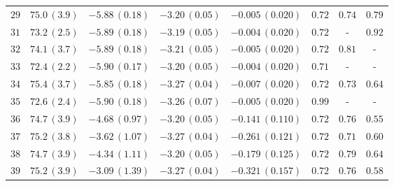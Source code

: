 \begin{center}
\begin{longtable}{@{\extracolsep{\fill}}cccccccc@{}}
$29$ & $75.0\,(3.9)$ & $-5.88\,(0.18)$ & $-3.20\,(0.05)$ & $-0.005\,(0.020) $ & $ 0.72 $ & $ 0.74 $ & $ 0.79$\\
$31$ & $73.2\,(2.5)$ & $-5.89\,(0.18)$ & $-3.19\,(0.05)$ & $-0.004\,(0.020) $ & $ 0.72$ & - & $ 0.92$\\
$32$ & $74.1\,(3.7)$ & $-5.89\,(0.18)$ & $-3.21\,(0.05)$ & $-0.005\,(0.020) $ & $ 0.72 $ & $ 0.81$ & -\\
$33$ & $72.4\,(2.2)$ & $-5.90\,(0.17)$ & $-3.20\,(0.05)$ & $-0.004\,(0.020) $ & $ 0.71$ & - & -\\
$34$ & $75.4\,(3.7)$ & $-5.85\,(0.18)$ & $-3.27\,(0.04)$ & $-0.007\,(0.020) $ & $ 0.72 $ & $ 0.73$ & $0.64 $\\
$35$ & $72.6\,(2.4)$ & $-5.90\,(0.18)$ & $-3.26\,(0.07)$ & $-0.005\,(0.020) $ & $ 0.99$ & - & - \\
$36$ & $74.7\,(3.9)$ & $-4.68\,(0.97)$ & $-3.20\,(0.05) $ & $-0.141\,(0.110) $ & $0.72 $ & $ 0.76$ & $0.55 $ \\
$37$ & $ 75.2\,(3.8)$ & $-3.62\,(1.07)$ & $-3.27\,(0.04)$ & $-0.261\,(0.121) $ & $0.72 $ & $ 0.71$ & $0.60 $\\
$38$ & $74.7\,(3.9)$ & $-4.34\,(1.11)$ & $-3.20\,(0.05)$ & $-0.179\,(0.125) $ & $0.72 $ & $0.79 $ & $ 0.64$\\
$39$ & $75.2\,(3.9)$ & $-3.09\,(1.39)$ & $-3.27\,(0.04)$ & $-0.321\,(0.157) $ & $ 0.72 $ & $0.76 $ & $0.58 $\\


\end{longtable}
\end{center}
